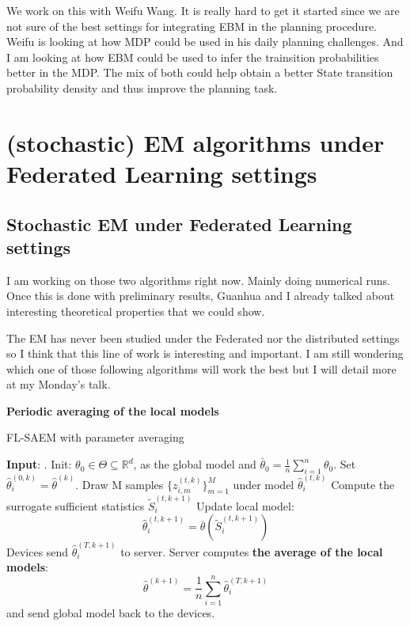 \documentclass{article}
\begin{document}
We work on this with Weifu Wang.
It is really hard to get it started since we are not sure of the best settings for integrating EBM in the planning procedure.
Weifu is looking at how MDP could be used in his daily planning challenges. And I am looking at how EBM could be used to infer the trainsition probabilities better in the MDP.
The mix of both could help obtain a better State transition probability density and thus improve the planning task.



\section{(stochastic) EM algorithms under Federated Learning settings}

\subsection{Stochastic EM under Federated Learning settings}

I am working on those two algorithms right now.
Mainly doing numerical runs.
Once this is done with preliminary results, Guanhua and I already talked about interesting theoretical properties that we could show.

The EM has never been studied under the Federated nor the distributed settings so I think that this line of work is interesting and important.
I am still wondering which one of those following algorithms will work the best but I will detail more at my Monday's talk.


\textbf{Periodic averaging of the local models}

\begin{algorithm}[H]
\caption{FL-SAEM with parameter averaging} \label{alg:flsaem}
\begin{algorithmic}[1]
\STATE \textbf{Input}: .
\STATE Init: $\theta_{0} \in \Theta \subseteq \mathbb R^d $, as the global model and $\bar{\theta}_0 =  \frac{1}{n} \sum_{i=1}^n \theta_0$.
\STATE Set $\hat{\theta}^{(0,k)}_i = \hat{\theta}^{(k)}$.
\STATE Draw M samples $\{z_{i,m}^{(t,k)}\}_{m=1}^{M}$ under model $\hat{\theta}^{(t,k)}_i$
\STATE Compute the surrogate sufficient statistics $\tilde{S}_{i}^{(t,k+1)}$
\STATE Update local model:
$$
\hat{\theta}^{(t,k+1)}_i = \overline{\theta}( \tilde{S}_i^{(t,k+1)}) 
$$
\ENDFOR
\STATE Devices send $\hat{\theta}^{(T,k+1)}_i$ to server.
\ENDFOR
\STATE Server computes \textbf{the average of the local models}:
$$
\hat{\theta}^{(k+1)} = \frac{1}{n} \sum_{i=1}^n \hat{\theta}^{(T,k+1)}_i
$$ 
and send global model back to the devices. \label{line:final}
\ENDFOR
\end{algorithmic}
\end{algorithm}
\end{document}
